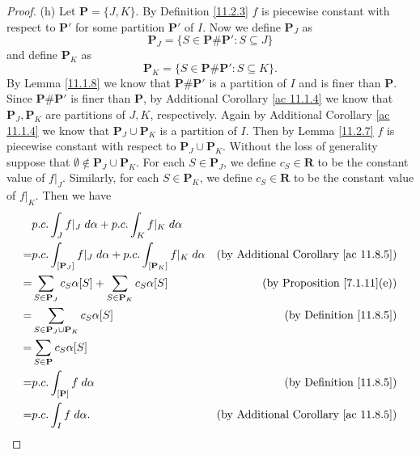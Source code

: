 \begin{proof}{(h)}
    Let \(\mathbf{P} = \{J, K\}\).
    By Definition \ref{11.2.3} \(f\) is piecewise constant with respect to \(\mathbf{P}'\) for some partition \(\mathbf{P}'\) of \(I\).
    Now we define \(\mathbf{P}_J\) as
    \[
        \mathbf{P}_J = \{S \in \mathbf{P} \# \mathbf{P}' : S \subseteq J\}
    \]
    and define \(\mathbf{P}_K\) as
    \[
        \mathbf{P}_K = \{S \in \mathbf{P} \# \mathbf{P}' : S \subseteq K\}.
    \]
    By Lemma \ref{11.1.8} we know that \(\mathbf{P} \# \mathbf{P}'\) is a partition of \(I\) and is finer than \(\mathbf{P}\).
    Since \(\mathbf{P} \# \mathbf{P}'\) is finer than \(\mathbf{P}\), by Additional Corollary \ref{ac 11.1.4} we know that \(\mathbf{P}_J, \mathbf{P}_K\) are partitions of \(J, K\), respectively.
    Again by Additional Corollary \ref{ac 11.1.4} we know that \(\mathbf{P}_J \cup \mathbf{P}_K\) is a partition of \(I\).
    Then by Lemma \ref{11.2.7} \(f\) is piecewise constant with respect to \(\mathbf{P}_J \cup \mathbf{P}_K\).
    Without the loss of generality suppose that \(\emptyset \notin \mathbf{P}_J \cup \mathbf{P}_K\).
    For each \(S \in \mathbf{P}_J\), we define \(c_S \in \mathbf{R}\) to be the constant value of \(f|_J\).
    Similarly, for each \(S \in \mathbf{P}_K\), we define \(c_S \in \mathbf{R}\) to be the constant value of \(f|_K\).
    Then we have
    \begin{align*}
          & p.c. \int_J f|_J \; d \alpha + p.c. \int_K f|_K \; d \alpha                                                                                  \\
        = & p.c. \int_{[\mathbf{P}_J]} f|_J \; d \alpha + p.c. \int_{[\mathbf{P}_K]} f|_K \; d \alpha & \text{(by Additional Corollary \ref{ac 11.8.5})} \\
        = & \sum_{S \in \mathbf{P}_J} c_S \alpha[S] + \sum_{S \in \mathbf{P}_K} c_S \alpha[S]         & \text{(by Proposition \ref{7.1.11}(e))}          \\
        = & \sum_{S \in \mathbf{P}_J \cup \mathbf{P}_K} c_S \alpha[S]                                 & \text{(by Definition \ref{11.8.5})}              \\
        = & \sum_{S \in \mathbf{P}} c_S \alpha[S]                                                                                                        \\
        = & p.c. \int_{[\mathbf{P}]} f \; d \alpha                                                    & \text{(by Definition \ref{11.8.5})}              \\
        = & p.c. \int_I f \; d \alpha.                                                                & \text{(by Additional Corollary \ref{ac 11.8.5})}
    \end{align*}
\end{proof}

